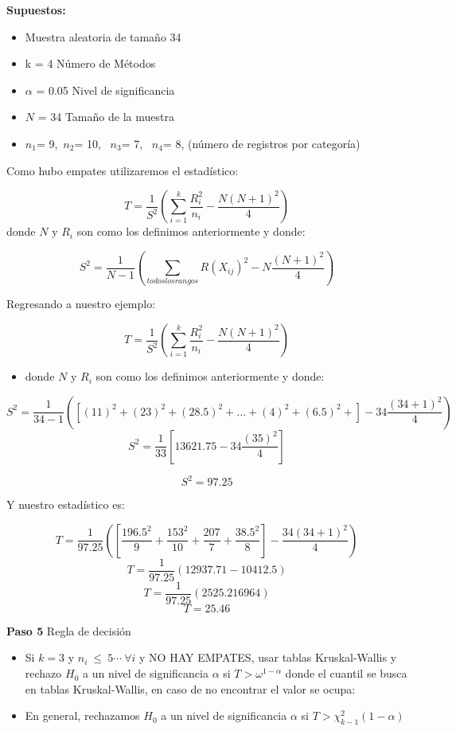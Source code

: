 \documentclass[
  a4paper,
  oneside,
  openany]{book}
\providecommand{\tightlist}{%
  \setlength{\itemsep}{0pt}\setlength{\parskip}{0pt}}
\begin{document}
\textbf{Supuestos:}

\begin{itemize}
\tightlist
\item
  Muestra aleatoria de tamaño 34
\item
  k = 4 Número de Métodos
\item
  \(\alpha\) = 0.05 Nivel de significancia
\item
  \(N\) = 34 Tamaño de la muestra
\item
  \(n_{1}\)= 9,~\(n_{2}\)= 10, ~\(n_{3}\)= 7, ~\(n_{4}\)= 8, (número de registros por categoría)
\end{itemize}

Como hubo empates utilizaremos el estadístico:

\[T= \frac{1}{S^2}\left(\sum_{i=1}^{k}\frac{R^2_{i}}{n_{i}}-\frac{N(N+1)^2}{4}\right)\]
donde \(N\) y \(R_{i}\) son como los definimos anteriormente y donde:

\[ S^2 = \frac{1}{N-1}\left(\sum_{todos los rangos}R(X_{ij})^2-N\frac{(N+1)^2}{4}\right)\]

Regresando a nuestro ejemplo:

\[T= \frac{1}{S^2}\left(\sum_{i=1}^{k}\frac{R^2_{i}}{n_{i}}-\frac{N(N+1)^2}{4}\right)\]

\begin{itemize}
\tightlist
\item
  donde \(N\) y \(R_{i}\) son como los definimos anteriormente y donde:
\end{itemize}

\[ S^2 = \frac{1}{34-1}\left(\left[(11)^2+(23)^2+(28.5)^2+\ldots+(4)^2+(6.5)^2+\right]-34\frac{(34+1)^2}{4}\right)\]
\[S^2 = \frac{1}{33}\left[13621.75-34\frac{(35)^2}{4}\right]\]

\[S^2 = 97.25\]

Y nuestro estadístico es:

\[T= \frac{1}{97.25}\left(\left[\frac{196.5^2}{9}+\frac{153^2}{10}+\frac{207}{7}+\frac{38.5^2}{8}\right]-\frac{34(34+1)^2}{4}\right)\]
\[T= \frac{1}{97.25}\left(12937.71-10412.5\right)\]
\[T= \frac{1}{97.25}\left(2525.216964\right)\]
\[T= 25.46\]

\textbf{Paso 5} Regla de decisión

\begin{itemize}
\item
  Si \(k =3\) y \(n_{i} \ \leq \ 5 \cdots \ \forall i\) y NO HAY EMPATES, usar tablas Kruskal-Wallis y rechazo \(H_0\) a un nivel de significancia \(\alpha\) si \(T > \omega^{1-\alpha}\) donde el cuantil se busca en tablas Kruskal-Wallis, en caso de no encontrar el valor se ocupa:
\item
  En general, rechazamos \(H_0\) a un nivel de significancia \(\alpha\) si \(T > \chi_{k-1}^2(1- \alpha)\)
\end{itemize}
\end{document}
